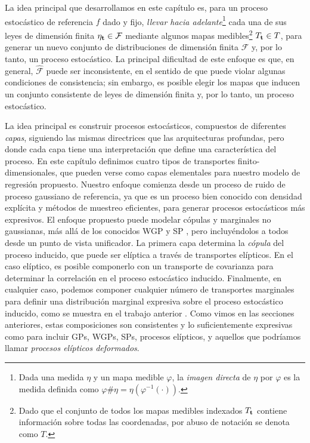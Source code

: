 La idea principal que desarrollamos en este capítulo es, para un proceso estocástico de referencia \(f\) dado y fijo, \emph{llevar hacia adelante}\footnote{Dada una medida \(\eta\) y un mapa medible \(\varphi\), la \emph{imagen directa} de \(\eta\) por \(\varphi\) es la medida definida como \(\varphi\#\eta = \eta(\varphi^{-1}(\cdot))\).} cada una de sus leyes de dimensión finita \(\eta_{\mathbf{t}} \in \mathcal{F}\) mediante algunos mapas medibles\footnote{Dado que el conjunto de todos los mapas medibles indexados \(T_{\mathbf{t}}\) contiene información sobre todas las coordenadas, por abuso de notación se denota como \(T\).} \(T_{\mathbf{t}} \in T\), para generar un nuevo conjunto de distribuciones de dimensión finita \(\mathcal{\hat F}\) y, por lo tanto, un proceso estocástico. La principal dificultad de este enfoque es que, en general, \(\mathcal{\hat F}\) puede ser inconsistente, en el sentido de que puede violar algunas condiciones de consistencia; sin embargo, es posible elegir los mapas que inducen un conjunto consistente de leyes de dimensión finita y, por lo tanto, un proceso estocástico.



La idea principal es construir procesos estocásticos, compuestos de diferentes \emph{capas}, siguiendo las mismas directrices que las arquitecturas profundas, pero donde cada capa tiene una interpretación que define una característica del proceso. En este capítulo definimos cuatro tipos de transportes finito-dimensionales, que pueden verse como capas elementales para nuestro modelo de regresión propuesto. Nuestro enfoque comienza desde un proceso de ruido de proceso gaussiano de referencia, ya que es un proceso bien conocido con densidad explícita y métodos de muestreo eficientes, para generar procesos estocásticos más expresivos. El enfoque propuesto puede modelar cópulas y marginales no gaussianas, más allá de los conocidos WGP \cite{snelson2004warped, rios2018learning, riostobar2019cwgp} y SP \cite{shah2014student}, pero incluyéndolos a todos desde un punto de vista unificador. La primera capa determina la \emph{cópula} del proceso inducido, que puede ser elíptica a través de transportes elípticos. En el caso elíptico, es posible componerlo con un transporte de covarianza para determinar la correlación en el proceso estocástico inducido. Finalmente, en cualquier caso, podemos componer cualquier número de transportes marginales para definir una distribución marginal expresiva sobre el proceso estocástico inducido, como se muestra en el trabajo anterior \cite{riostobar2019cwgp}. Como vimos en las secciones anteriores, estas composiciones son consistentes y lo suficientemente expresivas como para incluir GPs, WGPs, SPs, procesos elípticos, y aquellos que podríamos llamar \emph{procesos elípticos deformados}.


